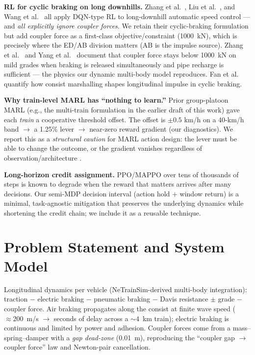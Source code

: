 \documentclass[conference]{IEEEtran}
\begin{document}
\textbf{RL for cyclic braking on long downhills.} Zhang et al.\ \cite{zhang2024},
Liu et al.\ \cite{liu2021}, and Wang et al.\ \cite{wang2025} all apply
DQN-type RL to long-downhill automatic speed control --- and \emph{all
explicitly ignore coupler forces}. We retain their cyclic-braking formulation
but add coupler force as a first-class objective/constraint (1000~kN), which is
precisely where the ED/AB division matters (AB is the impulse source). Zhang et
al.\ \cite{zhang2t2021} and Yang et al.\ \cite{yangmin} document that coupler
force stays below 1000~kN on mild grades when braking is released
simultaneously and pipe recharge is sufficient --- the physics our dynamic
multi-body model reproduces. Fan et al.\ \cite{fan2024} quantify how consist
marshalling shapes longitudinal impulse in cyclic braking.

\textbf{Why train-level MARL has ``nothing to learn.''} Prior group-platoon
MARL (e.g., the multi-train formulation in the earlier draft of this work)
gave each \emph{train} a cooperative threshold offset. The offset is $\pm 0.5$
km/h on a 40-km/h band $\rightarrow$ a 1.25\% lever $\rightarrow$ near-zero
reward gradient (our diagnostics). We report this as a \emph{structural
caution} for MARL action design: the lever must be able to change the outcome,
or the gradient vanishes regardless of observation/architecture
\cite{basile2022,liu2025}.

\textbf{Long-horizon credit assignment.} PPO/MAPPO over tens of thousands of
steps is known to degrade when the reward that matters arrives after many
decisions. Our semi-MDP decision interval (action hold $+$ window return) is a
minimal, task-agnostic mitigation that preserves the underlying dynamics while
shortening the credit chain; we include it as a reusable technique.

\section{Problem Statement and System Model}
\label{sec:model}

Longitudinal dynamics per vehicle (NeTrainSim-derived multi-body integration):
traction $-$ electric braking $-$ pneumatic braking $-$ Davis resistance
$\pm$ grade $-$ coupler force. Air braking propagates along the consist at
finite wave speed ($\approx 200$~m/s $\rightarrow$ seconds of delay across a
$\sim 4$~km train); electric braking is continuous and limited by power and
adhesion. Coupler forces come from a mass--spring--damper with a
\emph{gap dead-zone} (0.01~m), reproducing the ``coupler gap $\rightarrow$
coupler force'' law \cite{yangmin} and Newton-pair cancellation.
\end{document}
